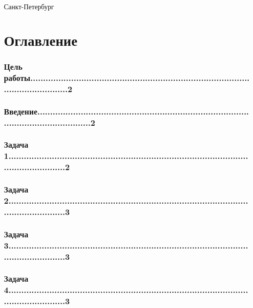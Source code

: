 \documentclass[12pt]{article}
\begin{document}
\par\bigskip\par\bigskip\par\bigskip\par\bigskip\par\bigskip\par\bigskip\par\bigskip\par\bigskip
\begin{center}
Санкт-Петербург
\par{}
\end{center}
\newpage
\pagestyle{plain}
\setcounter{page}{1}
\section*{Оглавление}
\subsubsection*{Цель работы...............................................................................................................2}
\subsubsection*{Введение.....................................................................................................................2}
\subsubsection*{Задача 1......................................................................................................................2}
\subsubsection*{Задача 2......................................................................................................................3}
\subsubsection*{Задача 3......................................................................................................................3}
\subsubsection*{Задача 4......................................................................................................................3}
\end{document}
